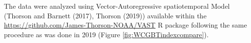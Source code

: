 \documentclass[11pt,
  english,
  a4paper,
]{article}
\begin{document}
\leavevmode\tagmcend\tagstructend\par


The data were analyzed using Vector-Autoregressive spatiotemporal Model ({Thorson and Barnett (2017)\leavevmode\tagmcend\tagstructend}, {Thorson (2019)\leavevmode\tagmcend\tagstructend}) available within the {\href{VAST}{https://github.com/James-Thorson-NOAA/VAST}\leavevmode\tagmcend\tagstructend} R package following the same procedure as was done in 2019 (Figure \ref{fig:WCGBTindexcompare}).

\leavevmode\tagmcend\tagstructend\par

\end{document}
